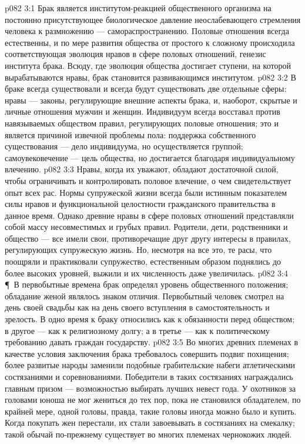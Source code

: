 \vs p082 3:1 Брак является институтом\hyp{}реакцией общественного организма на постоянно присутствующее биологическое давление неослабевающего стремления человека к размножению --- самораспространению. Половые отношения всегда естественны, и по мере развития общества от простого к сложному происходила соответствующая эволюция нравов в сфере половых отношений, генезис института брака. Всюду, где эволюция общества достигает ступени, на которой вырабатываются нравы, брак становится развивающимся институтом.
\vs p082 3:2 В браке всегда существовали и всегда будут существовать две отдельные сферы: нравы --- законы, регулирующие внешние аспекты брака, и, наоборот, скрытые и личные отношения мужчин и женщин. Индивидуум всегда восставал против навязываемых обществом правил, регулирующих половые отношения; это и является причиной извечной проблемы пола: поддержка собственного существования --- дело индивидуума, но осуществляется группой; самоувековечение --- цель общества, но достигается благодаря индивидуальному влечению.
\vs p082 3:3 Нравы, когда их уважают, обладают достаточной силой, чтобы ограничивать и контролировать половое влечение, о чем свидетельствует опыт всех рас. Нормы супружеской жизни всегда были истинным показателем силы нравов и функциональной целостности гражданского правительства в данное время. Однако древние нравы в сфере половых отношений представляли собой массу несовместимых и грубых правил. Родители, дети, родственники и общество --- все имели свои, противоречащие друг другу интересы в правилах, регулирующих супружескую жизнь. Но, несмотря на все это, те расы, что поощряли и практиковали супружество, естественным образом поднялись до более высоких уровней, выжили и их численность даже увеличилась.
\vs p082 3:4 \P\ В первобытные времена брак определял уровень общественного положения; обладание женой являлось знаком отличия. Первобытный человек смотрел на день своей свадьбы как на день своего вступления в самостоятельность и зрелость. В одно время к браку относились как к обязанности перед обществом; в другое --- как к религиозному долгу; а в третье --- как к политическому требованию давать граждан государству.
\vs p082 3:5 Во многих древних племенах в качестве условия заключения брака требовалось совершить подвиг похищения; более развитые народы заменили подобные грабительские набеги атлетическими состязаниями и соревнованиями. Победители в таких состязаниях награждались главным призом --- возможностью выбирать лучших невест года. У охотников за головами юноша не мог жениться до тех пор, пока не становился обладателем, по крайней мере, одной головы, правда, такие головы иногда можно было и купить. Когда покупать жен перестали, их стали завоевывать в состязаниях на смекалку; такой обычай по\hyp{}прежнему существует во многих племенах чернокожих людей.
